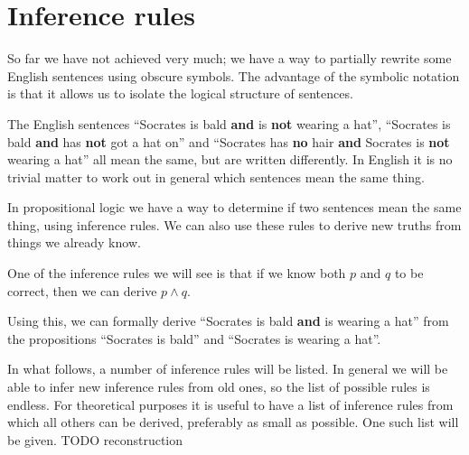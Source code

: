 \section{Inference rules}
So far we have not achieved very much; we have a way to partially rewrite some English sentences using obscure symbols. The advantage of the symbolic notation is that it allows us to isolate the logical structure of sentences. 

\begin{example}
The English sentences ``Socrates is bald \textbf{and} is \textbf{not} wearing a hat'', ``Socrates is bald \textbf{and} has \textbf{not} got a hat on'' and ``Socrates has \textbf{no} hair \textbf{and} Socrates is \textbf{not} wearing a hat'' all mean the same, but are written differently. In English it is no trivial matter to work out in general which sentences mean the same thing.
\end{example}

In propositional logic we have a way to determine if two sentences mean the same thing, using inference rules. We can also use these rules to derive new truths from things we already know. 
\begin{example}
One of the inference rules we will see is that if we know both $p$ and $q$ to be correct, then we can derive $p \land q$.

Using this, we can formally derive ``Socrates is bald \textbf{and} is wearing a hat'' from the propositions ``Socrates is bald'' and ``Socrates is wearing a hat''.
\end{example}

In what follows, a number of inference rules will be listed. In general we will be able to infer new inference rules from old ones, so the list of possible rules is endless. For theoretical purposes it is useful to have a list of inference rules from which all others can be derived, preferably as small as possible. One such list will be given. TODO reconstruction


